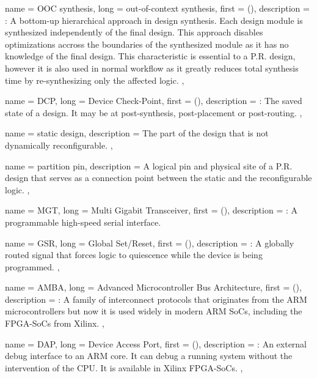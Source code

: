 {
	name = {OOC synthesis},
	long = {out-of-context synthesis},
	first = { ()},
	description = {\emph{}:
		A bottom-up hierarchical approach in design synthesis. 
		Each design module is synthesized independently of the final design.
		This approach disables optimizations accross the boundaries of the
		synthesized module as it has no knowledge of the final design.
		This characteristic is essential to a P.R. design, however it is also
		used in normal workflow as it greatly reduces total synthesis time by
		re-synthesizing only the affected logic.
	},
}

{
	name = {DCP},
	long = {Device Check-Point},
	first = { ()},
	description = {\emph{}:
		The saved state of a design. It may be at post-synthesis, post-placement or post-routing.
	},
}

{
	name = {static design},
	description = {
		The part of the design that is not dynamically reconfigurable.
	},
}

{
	name = {partition pin},
	description = {
		A logical pin and physical site of a P.R. design that 
		serves as a connection point between the static and the reconfigurable logic.
	},
}

{
	name = {MGT},
	long = {Multi Gigabit Transceiver},
	first = { ()},
	description = {\emph{}:
		A programmable high-speed serial interface.
	}
}

{
	name = {GSR},
	long = {Global Set/Reset},
	first = { ()},
	description = {\emph{}:
		A globally routed signal that forces logic to 
		quiescence while the device is being programmed.
	},
}

{
	name = {AMBA},
	long = {Advanced Microcontroller Bus Architecture},
	first = { ()},
	description = {\emph{}:
		A family of interconnect protocols that originates 
		from the ARM microcontrollers but now it is used widely
		in modern ARM SoCs, including the FPGA-SoCs from Xilinx.
	},
}


{
	name = {DAP},
	long = {Device Access Port},
	first = { ()},
	description = {\emph{}:
		An external debug interface to an ARM core. It can debug a running system
		without the intervention of the CPU. It is available in Xilinx FPGA-SoCs.
	},
}

